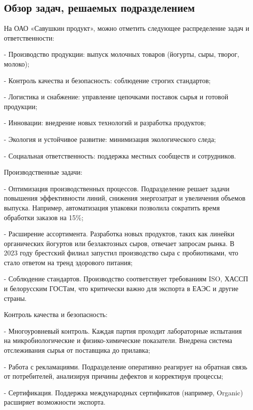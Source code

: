 \subtitlespace

\subsection*{  
  \gostTitleFont
   Обзор задач, решаемых подразделением
} 

\subtitlespace

{\gostFont

  \par \redline На ОАО «Савушкин продукт», можно отметить следующее распределение задач и ответственности:
  \par \redline - Производство продукции: выпуск молочных товаров (йогурты, сыры, творог, молоко);
  \par \redline - Контроль качества и безопасность: соблюдение строгих стандартов;
  \par \redline - Логистика и снабжение: управление цепочками поставок сырья и готовой продукции;
  \par \redline - Инновации: внедрение новых технологий и разработка продуктов;
  \par \redline - Экология и устойчивое развитие: минимизация экологического следа;
  \par \redline - Социальная ответственность: поддержка местных сообществ и сотрудников.

  \par \redline Производственные задачи:
  \par \redline - Оптимизация производственных процессов. Подразделение решает задачи повышения эффективности линий, снижения энергозатрат и увеличения объемов выпуска. Например, автоматизация упаковки позволила сократить время обработки заказов на 15\%;
  \par \redline - Расширение ассортимента. Разработка новых продуктов, таких как линейки органических йогуртов или безлактозных сыров, отвечает запросам рынка. В 2023 году брестский филиал запустил производство сыра с пробиотиками, что стало ответом на тренд здорового питания;
  \par \redline - Соблюдение стандартов. Производство соответствует требованиям ISO, ХАССП и белорусским ГОСТам, что критически важно для экспорта в ЕАЭС и другие страны.

  \par \redline Контроль качества и безопасность:
  \par \redline - Многоуровневый контроль. Каждая партия проходит лабораторные испытания на микробиологические и физико-химические показатели. Внедрена система отслеживания сырья от поставщика до прилавка;
  \par \redline - Работа с рекламациями. Подразделение оперативно реагирует на обратная связь от потребителей, анализируя причины дефектов и корректируя процессы;
  \par \redline - Сертификация. Поддержка международных сертификатов (например, Organic) расширяет возможности экспорта.

}
